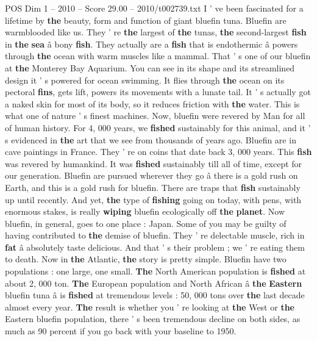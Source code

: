 \begin{textsample}{POS Dim 1 – 2010 – Score 29.00 – 2010/t002739.txt}  \label{ex:f1_pos_027}
I ' ve been fascinated for a lifetime by \textbf{the} beauty, form and function of giant bluefin tuna.
Bluefin are warmblooded like us.
They ' re \textbf{the} largest of \textbf{the} tunas, \textbf{the} second-largest \textbf{fish} in \textbf{the} \textbf{sea} â bony \textbf{fish}.
They actually are a \textbf{fish} that is endothermic â powers through \textbf{the} ocean with warm muscles like a mammal.
That ' s one of our bluefin at \textbf{the} Monterey Bay Aquarium.
You can see in its shape and its streamlined design it ' s powered for ocean swimming.
It flies through \textbf{the} ocean on its pectoral \textbf{fins}, gets lift, powers its movements with a lunate tail.
It ' s actually got a naked skin for most of its body, so it reduces friction with \textbf{the} water.
This is what one of nature ' s finest machines.
Now, bluefin were revered by Man for all of human history.
For 4, 000 years, we \textbf{fished} sustainably for this animal, and it ' s evidenced in \textbf{the} art that we see from thousands of years ago.
Bluefin are in cave paintings in France.
They ' re on coins that date back 3, 000 years.
This \textbf{fish} was revered by humankind.
It was \textbf{fished} sustainably till all of time, except for our generation.
Bluefin are pursued wherever they go â there is a gold rush on Earth, and this is a gold rush for bluefin.
There are traps that \textbf{fish} sustainably up until recently.
And yet, \textbf{the} type of \textbf{fishing} going on today, with pens, with enormous stakes, is really \textbf{wiping} bluefin ecologically off \textbf{the} \textbf{planet}.
Now bluefin, in general, goes to one place : Japan.
Some of you may be guilty of having contributed to \textbf{the} demise of bluefin.
They ' re delectable muscle, rich in \textbf{fat} â absolutely taste delicious.
And that ' s their problem ; we ' re eating them to death.
Now in \textbf{the} Atlantic, \textbf{the} story is pretty simple.
Bluefin have two populations : one large, one small. \textbf{The} North American population is \textbf{fished} at about 2, 000 ton. \textbf{The} European population and North African â \textbf{the} \textbf{Eastern} bluefin tuna â is \textbf{fished} at tremendous levels : 50, 000 tons over \textbf{the} last decade almost every year. \textbf{The} result is whether you ' re looking at \textbf{the} West or \textbf{the} Eastern bluefin population, there ' s been tremendous decline on both sides, as much as 90 percent if you go back with your baseline to 1950.

\end{textsample}
